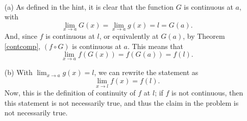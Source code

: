 \begin{problem}[6-12] \ 
\begin{enumerate}
\item[(a)]
As defined in the hint, it is clear that the function $G$ is continuous at $a$, with
\[ \lim_{x \to a} G(x) = \lim_{x \to a} g(x) = l = G(a). \]
And, since $f$ is continuous at $l$, or equivalently at $G(a)$, by Theorem \ref{contcomp}, $(f \circ G)$ is continuous at $a$. This means that 
\[ \lim_{x \to a} f(G(x)) = f(G(a)) = f(l). \]

\item[(b)]
With $\lim_{x \to a} g(x) = l$, we can rewrite the statement as
\[ \lim_{x \to l} f(x) = f(l). \]
Now, this is the definition of continuity of $f$ at $l$; if $f$ is not continuous, then this statement is not necessarily true, and thus the claim in the problem is not necessarily true.
\end{enumerate}
\end{problem}
